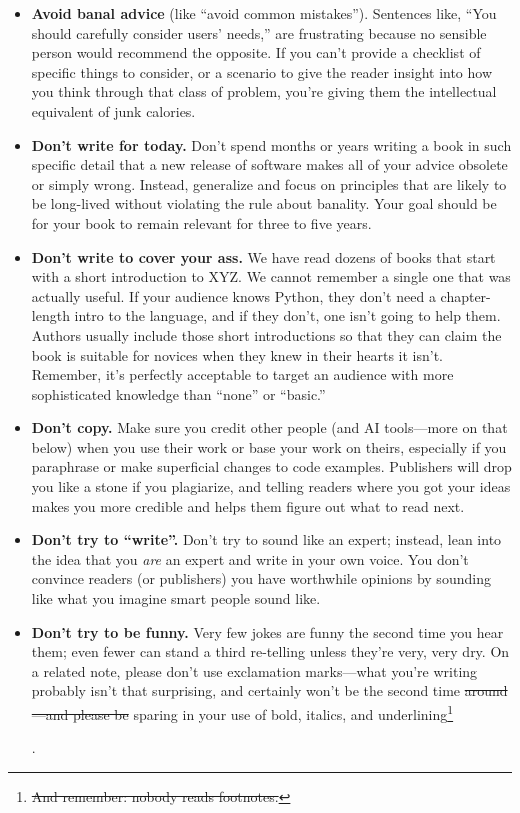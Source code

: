 \documentclass[10pt,letterpaper]{article}
\providecommand{\DIFadd}[1]{{\protect\color{blue}\uwave{#1}}} %
\providecommand{\DIFdel}[1]{{\protect\color{red}\sout{#1}}}                      %
\providecommand{\DIFaddbegin}{} %
\providecommand{\DIFaddend}{} %
\providecommand{\DIFdelbegin}{} %
\providecommand{\DIFdelend}{} %
\begin{document}
\begin{itemize}
\item
  \textbf{Avoid banal advice} (like ``avoid common mistakes'').
  Sentences like, ``You should carefully consider users' needs,'' are
  frustrating because no sensible person would recommend the opposite.
  If you can't provide a checklist of specific things to
  consider, or a scenario to give the reader insight into how you think
  through that class of problem, you're giving them the intellectual
  equivalent of junk calories.
\item
  \textbf{Don't write for today.} Don't spend months or years
  writing a book in such specific detail that a new release of software
  makes all of your advice obsolete or simply wrong. Instead, generalize
  and focus on principles that are likely to be long-lived without
  violating the rule about banality. Your goal should be for your book
  to remain relevant for three to five years.
\item
  \textbf{Don't write to cover your ass.} We have read dozens of books
  that start with a short introduction to XYZ. We cannot remember a
  single one that was actually useful. If your audience knows Python,
  they don't need a chapter-length intro to the language, and if they
  don't, one isn't going to help them. Authors usually include those
  short introductions so that they can claim the book is suitable for
  novices when they knew in their hearts it isn't. Remember, it's
  perfectly acceptable to target an audience with more sophisticated
  knowledge than ``none'' or ``basic.''
\item
  \textbf{Don't copy.} Make sure you credit other people (and AI
  tools---more on that below) when you use their work or base your
  work on theirs, especially if you paraphrase or make superficial
  changes to code examples.  Publishers will drop you like a stone if
  you plagiarize, and telling readers where you got your ideas makes
  you more credible and helps them figure out what to read next.
\item
  \textbf{Don't try to ``write''.} Don't try to sound like an
  expert; instead, lean into the idea that you \emph{are} an expert and
  write in your own voice. You don't convince readers (or publishers)
  you have worthwhile opinions by sounding like what you imagine smart
  people sound like.
\item
  \textbf{Don't try to be funny.} Very few jokes are funny the second
  time you hear them; even fewer can stand a third re-telling unless
  they're very, very dry. On a related note, please don't use
  exclamation marks---what you're writing probably isn't that
  surprising, and certainly won't be the second time \DIFdelbegin \DIFdel{around---and
  please be }\DIFdelend \DIFaddbegin \DIFadd{around---be
  }\DIFaddend sparing in your use of bold, italics, and underlining\DIFdelbegin \footnote{\DIFdel{And remember: nobody reads footnotes.}}%
\addtocounter{footnote}{-1}%
\DIFdelend \DIFaddbegin \DIFadd{, and
  remember that nobody reads footnotes}\DIFaddend .
\end{itemize}
\end{document}
